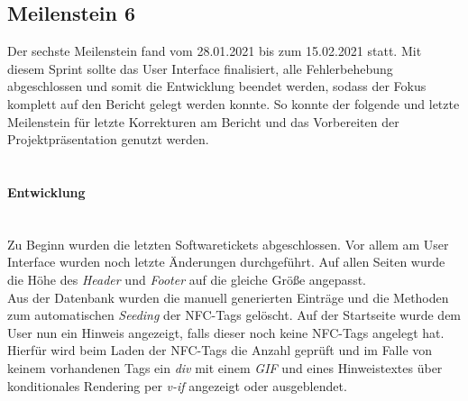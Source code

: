 \documentclass[10pt, a4paper]{article}
\begin{document}
\begin{onehalfspace}
\subsection{Meilenstein 6}
Der sechste Meilenstein fand vom 28.01.2021 bis zum 15.02.2021 statt.
Mit diesem Sprint sollte das User Interface finalisiert, alle Fehlerbehebung abgeschlossen und somit die Entwicklung beendet werden, sodass der Fokus komplett auf den Bericht gelegt werden konnte.
So konnte der folgende und letzte Meilenstein für letzte Korrekturen am Bericht und das Vorbereiten der Projektpräsentation genutzt werden.
\\~\\
\paragraph*{Entwicklung} $~$ \\
Zu Beginn wurden die letzten Softwaretickets abgeschlossen. Vor allem am User Interface wurden noch letzte Änderungen durchgeführt.
Auf allen Seiten wurde die Höhe des \textit{Header} und \textit{Footer} auf die gleiche Größe angepasst. \\
Aus der Datenbank wurden die manuell generierten Einträge und die Methoden zum automatischen \textit{Seeding} der NFC-Tags gelöscht.
Auf der Startseite wurde dem User nun ein Hinweis angezeigt, falls dieser noch keine NFC-Tags angelegt hat. Hierfür wird beim Laden der NFC-Tags die Anzahl geprüft und im Falle von keinem vorhandenen Tags ein \textit{div} mit einem \textit{GIF} und eines Hinweistextes über konditionales Rendering per \textit{v-if} angezeigt oder ausgeblendet.


\end{onehalfspace}
\end{document}
